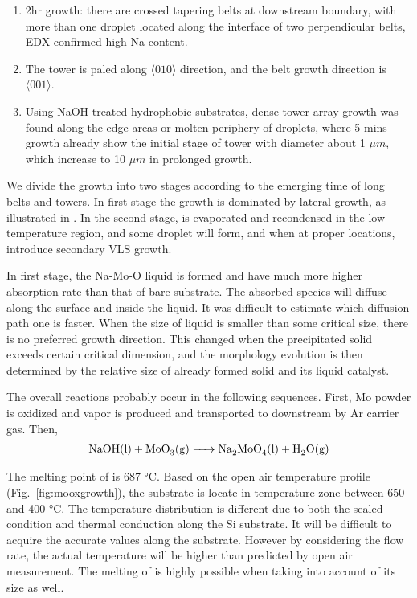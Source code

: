 \begin{enumerate}
\item 2hr growth: there are crossed tapering belts at downstream boundary, with more than one droplet located along the interface of two perpendicular belts, EDX confirmed high Na content.
\item The tower is paled along $\langle010\rangle$ direction, and the belt growth direction is $\langle001\rangle$.
\item Using NaOH treated hydrophobic substrates, dense tower array growth was found along the edge areas or molten periphery of droplets, where 5 mins growth already show the initial stage of tower with diameter about 1 $\mu m$, which increase to 10 $\mu m$ in prolonged growth.
\end{enumerate}

We divide the growth into two stages according to the emerging time of long belts and towers. In first stage the growth is dominated by lateral growth, as illustrated in . In the second stage,  is evaporated and recondensed in the low temperature region, and some droplet will form, and when at proper locations, introduce secondary VLS growth.

In first stage, the Na-Mo-O liquid is formed and have much more higher absorption rate than that of bare substrate. The absorbed species will diffuse along the surface and inside the liquid. It was difficult to estimate which diffusion path one is faster. When the size of liquid is smaller than some critical size, there is no preferred growth direction. This changed when the precipitated solid exceeds certain critical dimension, and the morphology evolution is then determined by the relative size of already formed solid and its liquid catalyst.


The overall reactions probably occur in the following sequences.
First, Mo powder is oxidized and  vapor is produced and transported to downstream by Ar carrier gas. Then,
\begin{align}
\cee{NaOH(l) + MoO3(g) -> Na2MoO4(l) + H2O(g)}
\end{align}

The melting point of  is 687 \si{\degreeCelsius}. Based on the open air temperature profile (Fig.~\ref{fig:mooxgrowth}), the substrate is locate in temperature zone between 650 and 400 \si{\degreeCelsius}. The temperature distribution is different due to both the sealed condition and thermal conduction along the Si substrate. It will be difficult to acquire the accurate values along the substrate. However by considering the flow rate, the actual temperature will be higher than predicted by open air measurement.\cite{Subannajui2010} The melting of  is highly possible when taking into account of its size as well. \cite{Bruggemann1997}

